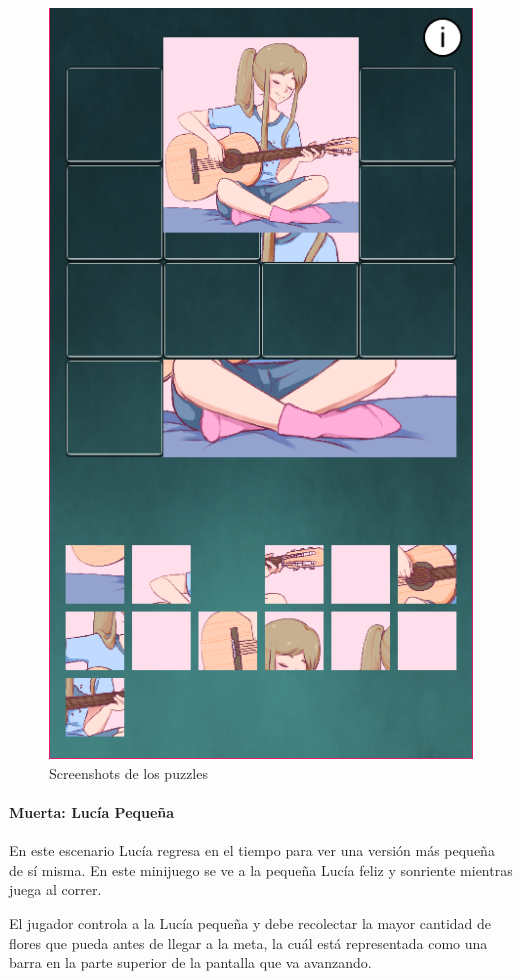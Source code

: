 \begin{figure}[h]
\begin{minipage}{0.45\textwidth}
\begin{flushright}
	   		\includegraphics[scale=.5]{imgs/screenshot08.png}
		\end{flushright}
	\end{minipage}
	\caption{Screenshots de los puzzles}
	\label{multifig:recuerdos}
\end{figure}

\newpage
\paragraph{Muerta: Lucía Pequeña}
En este escenario Lucía regresa en el tiempo para ver una versión más pequeña de sí misma. En este minijuego se ve a la pequeña Lucía feliz y sonriente mientras juega al correr.

El jugador controla a la Lucía pequeña y debe recolectar la mayor cantidad de flores que pueda antes de llegar a la meta, la cuál está representada como una barra en la parte superior de la pantalla que va avanzando.

